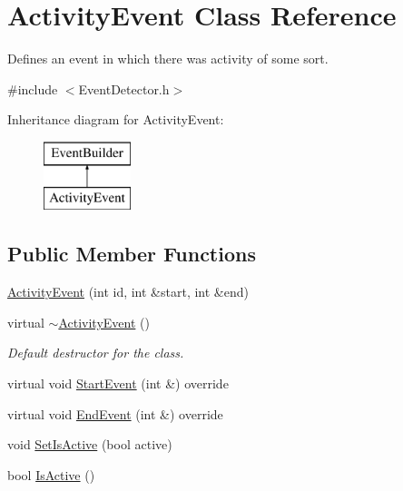 \hypertarget{class_activity_event}{}\section{Activity\+Event Class Reference}
\label{class_activity_event}


Defines an event in which there was activity of some sort.  




{\ttfamily \#include $<$Event\+Detector.\+h$>$}

Inheritance diagram for Activity\+Event\+:\begin{figure}[H]
\begin{center}
\leavevmode
\includegraphics[height=2.000000cm]{class_activity_event}
\end{center}
\end{figure}
\subsection*{Public Member Functions}
\begin{DoxyCompactItemize}
\item 
\mbox{\hyperlink{class_activity_event_a25ca9abc3912170b53ede820a826fc7d}{Activity\+Event}} (int id, int \&start, int \&end)
\item 
\mbox{\label{class_activity_event_a0906ddd42f0750876d30884f9dceb8a0}} 
virtual \mbox{\hyperlink{class_activity_event_a0906ddd42f0750876d30884f9dceb8a0}{$\sim$\+Activity\+Event}} ()
\begin{DoxyCompactList}\small\item\em Default destructor for the class. \end{DoxyCompactList}\item 
virtual void \mbox{\hyperlink{class_activity_event_a949f9ddfc7c259c1b46a38bc9e1a7d47}{Start\+Event}} (int \&) override
\item 
virtual void \mbox{\hyperlink{class_activity_event_a803c52c6e131e3da665a67424b6acd2d}{End\+Event}} (int \&) override
\item 
void \mbox{\hyperlink{class_activity_event_a631e0a9a4e1b5f607f5990c749907fa1}{Set\+Is\+Active}} (bool active)
\item 
bool \mbox{\hyperlink{class_activity_event_a54595bd5d8bc09d8b41a0942d5543891}{Is\+Active}} ()
\end{DoxyCompactItemize}
